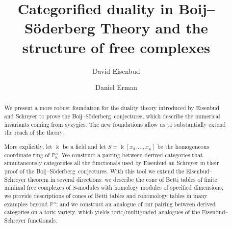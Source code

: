 \documentclass[12pt]{amsart}
\title{Categorified duality in Boij--S\"oderberg Theory and the structure of free complexes}
\author{David Eisenbud}
\author{Daniel Erman}\thanks{The first author was partially supported by an NSF grant, and the second author was partially supported by an NSF fellowship and by a Simons Foundation fellowship.}
\theoremstyle{definition}
\theoremstyle{remark}
\newcommand{\kk}{\Bbbk}
\newcommand{\PP}{\mathbb{P}}
\renewcommand{\P}{{\mathbb P}}
\def\BS{Boij--S\"oderberg~}
\begin{document}
\begin{abstract} We present a more robust foundation for the duality theory introduced by Eisenbud and Schreyer to prove the \BS conjectures, which describe the numerical invariants coming from syzygies.
The new foundations allow us to substantially extend the reach of the theory.

More explicitly, let $\kk$ be a field and let $S = \kk[x_{0}, \dots,x_{n}]$ be the homogeneous coordinate ring of $\PP^{n}_{\kk}$.
We construct a pairing between derived categories that
simultaneously categorifies all the functionals used by Eisenbud an Schreyer in their proof of the \BS conjectures.
With this tool we extend the Eisenbud--Schreyer theorem in several directions: we describe the cone of Betti tables of finite, minimal free complexes of $S$-modules with homology modules of specified dimensions;  we provide descriptions of cones of Betti tables and cohomology tables in many examples beyond $\PP^n$; and we construct an analogue of our pairing between derived categories on a toric variety, which yields toric/multigraded analogues of the Eisenbud--Schreyer functionals.
\end{abstract}
\end{document}
